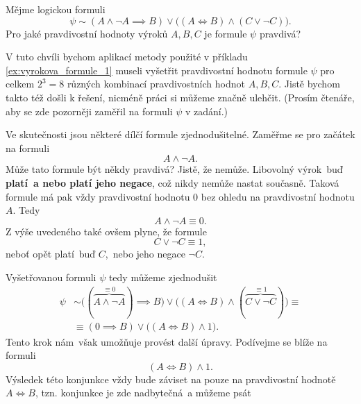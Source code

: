 \begin{example}\label{ex:vyrokova_formule_2}
    Mějme logickou formuli
    \begin{equation*}
        \psi\sim (A \land \neg A \implies B) \lor \bigl((A \iff B) \land (C \lor \neg C)\bigr).
    \end{equation*}
    Pro jaké pravdivostní hodnoty výroků $A,B,C$ je formule $\psi$ pravdivá?
    \begin{solution}
        V tuto chvíli bychom aplikací metody použité v příkladu \ref{ex:vyrokova_formule_1} museli vyšetřit pravdivostní hodnotu formule $\psi$ pro celkem $2^3=8$ různých kombinací pravdivostních hodnot $A,B,C$. Jistě bychom takto též došli k řešení, nicméně práci si můžeme značně ulehčit. (Prosím čtenáře, aby se zde pozorněji zaměřil na formuli $\psi$ v zadání.)\par
        Ve skutečnosti jsou některé dílčí formule zjednodušitelné. Zaměřme se pro začátek na formuli
        \begin{equation*}
            A \land \neg A.
        \end{equation*}
        Může tato formule být někdy pravdivá? Jistě, že nemůže. Libovolný výrok~buď \textbf{platí~a nebo platí jeho negace}, což nikdy nemůže nastat současně. Taková formule má pak vždy pravdivostní hodnotu 0 bez ohledu na pravdivostní hodnotu $A$. Tedy
        \begin{equation*}
            A \land \neg A\equiv 0.
        \end{equation*}
        Z výše uvedeného také ovšem plyne, že formule
        \begin{equation*}
            C \lor \neg C\equiv 1,
        \end{equation*}
        neboť opět platí~buď $C$,~nebo jeho negace $\neg C$.\par
        Vyšetřovanou formuli $\psi$ tedy můžeme zjednodušit
        \begin{align*}
            \psi&\sim \bigl((\overbrace{A \land \neg A}^{\equiv 0}) \implies B\bigr) \lor \bigl((A \iff B) \land (\overbrace{C \lor \neg C}^{\equiv 1})\bigr)\equiv  \\ &\equiv (0 \implies B) \lor \bigl((A \iff B) \land 1\bigr).
        \end{align*}
        Tento krok nám~však umožňuje provést další úpravy. Podívejme se blíže na formuli
        \begin{equation*}
            (A \iff B) \land 1.
        \end{equation*}
        Výsledek této konjunkce vždy bude záviset na pouze na pravdivostní hodnotě $A \iff B$, tzn. konjunkce je zde nadbytečná~a můžeme psát

\end{solution}
\end{example}
